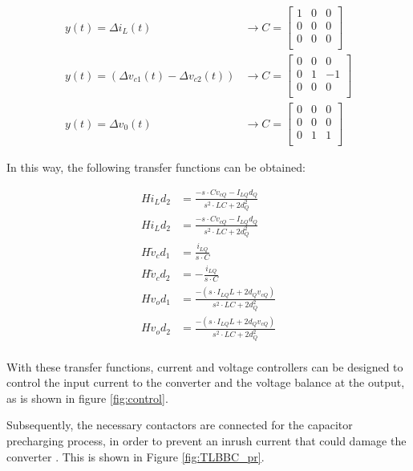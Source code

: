 \begin{align*}
y(t)=\Delta{i}_{L}(t)&\rightarrow C=\begin{bmatrix}
        	1 & 0 & 0 \\
        	0 & 0 & 0 \\
        	0 & 0 & 0 \\
    	\end{bmatrix}\\
y(t)=(\Delta{v}_{c1}(t)-\Delta{v}_{c2}(t))&\rightarrow C=\begin{bmatrix}
        	0 & 0 & 0 \\
        	0 & 1 & -1 \\
        	0 & 0 & 0 \\
    	\end{bmatrix}\\
y(t)=\Delta{v}_{0}(t)&\rightarrow C=\begin{bmatrix}
        	0 & 0 & 0 \\
        	0 & 0 & 0 \\
        	0 & 1 & 1 \\
    	\end{bmatrix}
\end{align*}	

In this way, the following transfer functions can be obtained:

\begin{align}
H{i}_{L}{d}_{2}&=\frac{-s\cdot C{v}_{cQ}-{I}_{LQ}{d}_{Q}}{{s}^{2}\cdot LC+2{d}_{Q}^2}\\
H{i}_{L}{d}_{2}&=\frac{-s\cdot C{v}_{cQ}-{I}_{LQ}{d}_{Q}}{{s}^{2}\cdot LC+2{d}_{Q}^2}\\
H{\tilde{v}}_{c}{d}_{1}&=\frac{{i}_{LQ}}{s\cdot C}\\
H{\tilde{v}}_{c}{d}_{2}&=-\frac{{i}_{LQ}}{s\cdot C}\\
H{v}_{o}{d}_{1}&=\frac{-(s\cdot {I}_{LQ}L+2{d}_{Q}{v}_{cQ})}{{s}^{2}\cdot LC+2{d}_{Q}^2}\\
H{v}_{o}{d}_{2}&=\frac{-(s\cdot {I}_{LQ}L+2{d}_{Q}{v}_{cQ})}{{s}^{2}\cdot LC+2{d}_{Q}^2}\\
\end{align}

With these transfer functions, current and voltage controllers can be designed to control the input current to the converter and the voltage balance at the output, as is shown in figure \ref{fig:control}.

Subsequently, the necessary contactors are connected for the capacitor precharging process, in order to prevent an inrush current that could damage the converter \cite{sensata}. This is shown in Figure \ref{fig:TLBBC_pr}.

